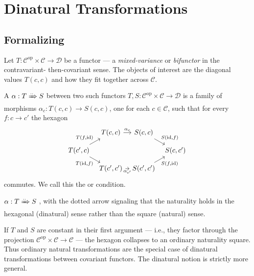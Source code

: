 \section{Dinatural Transformations}
\label{sec:dinatural}

\subsection{Formalizing}

Let $T : \mathcal{C}^{\mathrm{op}} \times \mathcal{C} \to \mathcal{D}$ be a
functor — a \emph{mixed-variance} or \emph{bifunctor} in the contravariant-
then-covariant sense. The objects of interest are the diagonal values
$T(c, c)$ and how they fit together across $\mathcal{C}$.

\begin{definition}
\label{def:dinatural}
A  $\alpha : T \xRightarrow{..} S$ between two
such functors $T, S : \mathcal{C}^{\mathrm{op}} \times \mathcal{C} \to
\mathcal{D}$ is a family of morphisms $\alpha_c : T(c,c) \to S(c,c)$,
one for each $c \in \mathcal{C}$, such that for every $f : c \to c'$ the
hexagon
\begin{equation*}
\begin{tikzcd}[column sep=tiny, row sep=small]
  & T(c, c) \arrow[r, "\alpha_c"] & S(c, c) \arrow[dr, "{S(\mathrm{id}, f)}"] & \\
  T(c', c) \arrow[ur, "{T(f, \mathrm{id})}"] \arrow[dr, "{T(\mathrm{id}, f)}" '] & & & S(c, c') \\
  & T(c', c') \arrow[r, "\alpha_{c'}" '] & S(c', c') \arrow[ur, "{S(f, \mathrm{id})}" '] &
\end{tikzcd}
\end{equation*}
commutes. We call this the  or  condition.
\end{definition}

\begin{howtosay}
$\alpha : T \xRightarrow{..} S$ , with
the dotted arrow signaling that the naturality holds in the hexagonal
(dinatural) sense rather than the square (natural) sense.
\end{howtosay}

\begin{remark}
If $T$ and $S$ are constant in their first argument — i.e., they factor
through the projection $\mathcal{C}^{\mathrm{op}} \times \mathcal{C} \to
\mathcal{C}$ — the hexagon collapses to an ordinary naturality square. Thus
ordinary natural transformations are the special case of dinatural
transformations between covariant functors. The dinatural notion is strictly
more general.
\end{remark}

